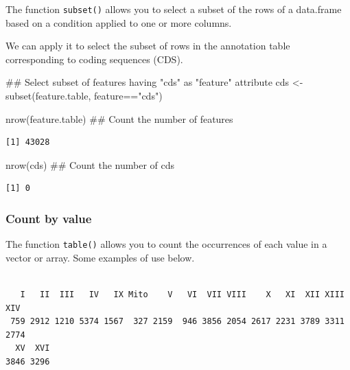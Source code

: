 \documentclass[]{article}
\newenvironment{Shaded}{\begin{snugshade}}{\end{snugshade}}
\newcommand{\KeywordTok}[1]{\textcolor[rgb]{0.94,0.87,0.69}{#1}}
\newcommand{\StringTok}[1]{\textcolor[rgb]{0.80,0.58,0.58}{#1}}
\newcommand{\OperatorTok}[1]{\textcolor[rgb]{0.94,0.94,0.82}{#1}}
\newcommand{\NormalTok}[1]{\textcolor[rgb]{0.80,0.80,0.80}{#1}}
\begin{document}
The function \texttt{subset()} allows you to select a subset of the rows
of a data.frame based on a condition applied to one or more columns.

We can apply it to select the subset of rows in the annotation table
corresponding to coding sequences (CDS).

\begin{Shaded}
\begin{Highlighting}[]
\NormalTok{## Select subset of features having "cds" as "feature" attribute}
\NormalTok{cds <-}\StringTok{ }\KeywordTok{subset}\NormalTok{(feature.table, feature}\OperatorTok{==}\StringTok{"cds"}\NormalTok{)}

\KeywordTok{nrow}\NormalTok{(feature.table) ## Count the number of features}
\end{Highlighting}
\end{Shaded}

\begin{verbatim}
[1] 43028
\end{verbatim}

\begin{Shaded}
\begin{Highlighting}[]
\KeywordTok{nrow}\NormalTok{(cds) ## Count the number of cds}
\end{Highlighting}
\end{Shaded}

\begin{verbatim}
[1] 0
\end{verbatim}

\subsubsection{Count by value}\label{count-by-value}

The function \texttt{table()} allows you to count the occurrences of
each value in a vector or array. Some examples of use below.

\begin{Shaded}
\end{Shaded}

\begin{verbatim}

   I   II  III   IV   IX Mito    V   VI  VII VIII    X   XI  XII XIII  XIV 
 759 2912 1210 5374 1567  327 2159  946 3856 2054 2617 2231 3789 3311 2774 
  XV  XVI 
3846 3296 
\end{verbatim}
\end{document}
